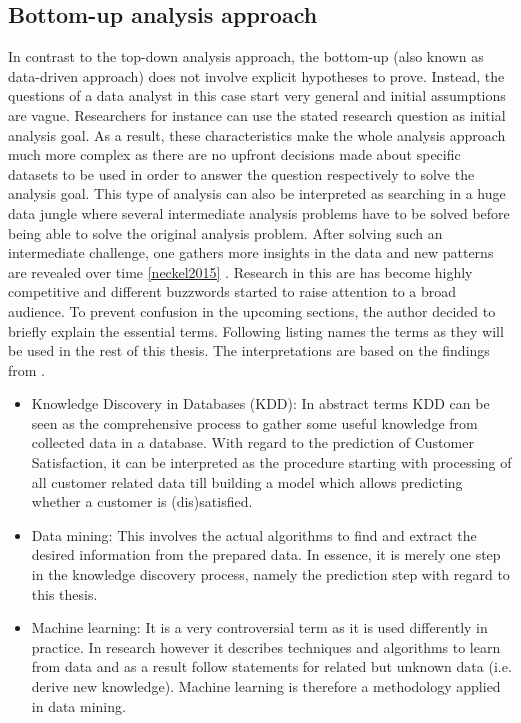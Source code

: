\subsection{Bottom-up analysis approach}
\label{ssec:bottomUp}
In contrast to the top-down analysis approach, the bottom-up (also known as data-driven approach) does not involve explicit hypotheses to prove. Instead, the questions of a data analyst in this case start very general and initial assumptions are vague. Researchers for instance can use the stated research question as initial analysis goal. As a result, these characteristics make the whole analysis approach much more complex as there are no upfront decisions made about specific datasets to be used in order to answer the question respectively to solve the analysis goal. This type of analysis can also be interpreted as searching in a huge data jungle where several intermediate analysis problems have to be solved before being able to solve the original analysis problem. After solving such an intermediate challenge, one gathers more insights in the data and new patterns are revealed over time \ref{neckel2015} \cite{fayyad1996data}. Research in this are has become highly competitive and different buzzwords started to raise attention to a broad audience. To prevent confusion in the upcoming sections, the author decided to briefly explain the essential terms. Following listing names the terms as they will be used in the rest of this thesis. The interpretations are based on the findings from \cite{fayyad1996data}. 

\begin{itemize}
	\item Knowledge Discovery in Databases (KDD): In abstract terms KDD can be seen as the comprehensive process to gather some useful knowledge from collected data in a database. With regard to the prediction of Customer Satisfaction, it can be interpreted as the procedure starting with processing of all customer related data till building a model which allows predicting whether a customer is (dis)satisfied.
	\item Data mining: This involves the actual algorithms to find and extract the desired information from the prepared data. In essence, it is merely one step in the knowledge discovery process, namely the prediction step with regard to this thesis. 
	\item Machine learning: It is a very controversial term as it is used differently in practice. In research however it describes techniques and algorithms to learn from data and as a result follow statements for related but unknown data (i.e. derive new knowledge). Machine learning is therefore a methodology applied in data mining. 
\end{itemize}

